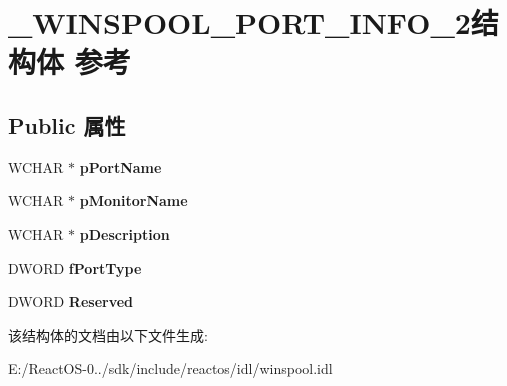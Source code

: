 \hypertarget{struct___w_i_n_s_p_o_o_l___p_o_r_t___i_n_f_o__2}{}\section{\+\_\+\+W\+I\+N\+S\+P\+O\+O\+L\+\_\+\+P\+O\+R\+T\+\_\+\+I\+N\+F\+O\+\_\+2结构体 参考}
\label{struct___w_i_n_s_p_o_o_l___p_o_r_t___i_n_f_o__2}
\subsection*{Public 属性}
\begin{DoxyCompactItemize}
\item 
\mbox{\label{struct___w_i_n_s_p_o_o_l___p_o_r_t___i_n_f_o__2_ab606e42c13c07a66db1123d26c77f8cb}} 
W\+C\+H\+AR $\ast$ {\bfseries p\+Port\+Name}
\item 
\mbox{\label{struct___w_i_n_s_p_o_o_l___p_o_r_t___i_n_f_o__2_a265c300535b6e0a3a559085680c7c229}} 
W\+C\+H\+AR $\ast$ {\bfseries p\+Monitor\+Name}
\item 
\mbox{\label{struct___w_i_n_s_p_o_o_l___p_o_r_t___i_n_f_o__2_ab8c6787da8276b6f0578b84e30f8e20f}} 
W\+C\+H\+AR $\ast$ {\bfseries p\+Description}
\item 
\mbox{\label{struct___w_i_n_s_p_o_o_l___p_o_r_t___i_n_f_o__2_ae995a745bd1815964faf6b63e129d79a}} 
D\+W\+O\+RD {\bfseries f\+Port\+Type}
\item 
\mbox{\label{struct___w_i_n_s_p_o_o_l___p_o_r_t___i_n_f_o__2_a454b889a14b0c4f0d362606b13df6716}} 
D\+W\+O\+RD {\bfseries Reserved}
\end{DoxyCompactItemize}


该结构体的文档由以下文件生成\+:\begin{DoxyCompactItemize}
\item 
E\+:/\+React\+O\+S-\/0../sdk/include/reactos/idl/winspool.\+idl\end{DoxyCompactItemize}
